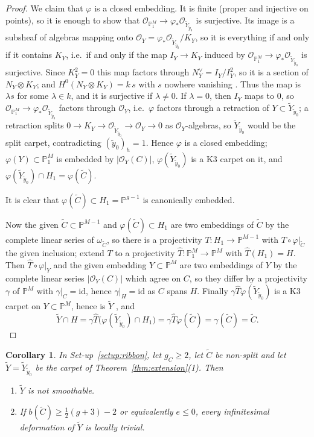 \documentclass[11pt,reqno]{amsart}
\theoremstyle{plain}
\newtheorem{corollary}[theorem]{Corollary}
\theoremstyle{definition}
\newcommand{\PP}{\mathbb{P}}
\newcommand{\PM}{\mathbb{P}^M}
\newcommand{\OO}{\mathcal{O}}
\newcommand{\id}{\mathrm{id}}
\newcommand{\Yt}{\widetilde{Y}}
\newcommand{\Ct}{\widetilde{C}}
\newcommand{\yt}{\tilde{y}}
\begin{document}
\begin{proof}
We claim that $\varphi$ is a closed embedding. It is finite (proper and injective on points), so it is enough to show that $\OO_{\PP^M_1}\to\varphi_*\OO_{\Yt_{\yt_0}}$ is surjective. Its image is a subsheaf of algebras mapping onto $\OO_Y=\varphi_*\OO_{\Yt_{\yt_0}}/K_Y$, so it is everything if and only if it contains $K_Y$, i.e.\ if and only if the map $I_Y\to K_Y$ induced by $\OO_{\PP^M_1}\to\varphi_*\OO_{\Yt_{\yt_0}}$ is surjective. Since $K_Y^2=0$ this map factors through $N_Y^{\vee}=I_Y/I_Y^2$, so it is a section of $N_Y\otimes K_Y$; and $H^0(N_Y\otimes K_Y)=k\,s$ with $s$ nowhere vanishing \cite[Proposition~3.2]{DM25}. Thus the map is $\lambda s$ for some $\lambda\in k$, and it is surjective if $\lambda\ne0$. If $\lambda=0$, then $I_Y$ maps to $0$, so $\OO_{\PP^M_1}\to\varphi_*\OO_{\Yt_{\yt_0}}$ factors through $\OO_Y$, i.e.\ $\varphi$ factors through a retraction of $Y\subset\Yt_{\yt_0}$; a retraction splits $0\to K_Y\to\OO_{\Yt_{\yt_0}}\to\OO_Y\to0$ as $\OO_Y$-algebras, so $\Yt_{\yt_0}$ would be the split carpet, contradicting $(\yt_0)_h=1$. Hence $\varphi$ is a closed embedding; $\varphi(Y)\subset\PP^M_1$ is embedded by $|\OO_Y(C)|$, $\varphi(\Yt_{\yt_0})$ is a K3 carpet on it, and $\varphi(\Yt_{\yt_0})\cap H_1=\varphi(\Ct)$.

It is clear that $\varphi(\Ct)\subset H_1=\PP^{g-1}$ is canonically embedded.

Now the given $\Ct\subset\PP^{M-1}$ and $\varphi(\Ct)\subset H_1$ are two embeddings of $\Ct$ by the complete linear series of $\omega_{\Ct}$, so there is a projectivity $T\colon H_1\to\PP^{M-1}$ with $T\circ\varphi|_{\Ct}$ the given inclusion; extend $T$ to a projectivity $\hat T\colon\PP^M_1\to\PM$ with $\hat T(H_1)=H$. Then $\hat T\circ\varphi|_Y$ and the given embedding $Y\subset\PM$ are two embeddings of $Y$ by the complete linear series $|\OO_Y(C)|$ which agree on $C$, so they differ by a projectivity $\gamma$ of $\PM$ with $\gamma|_C=\id$, hence $\gamma|_H=\id$ as $C$ spans $H$. Finally $\gamma\hat T\varphi(\Yt_{\yt_0})$ is a K3 carpet on $Y\subset\PM$, hence is $\Yt$ \cite[Proposition~1.7]{GP97}, and
\[
\Yt\cap H=\gamma\hat T\big(\varphi(\Yt_{\yt_0})\cap H_1\big)=\gamma\hat T\varphi(\Ct)=\gamma(\Ct)=\Ct .
\]
\end{proof}

\begin{corollary}\label{cor:nonsmoothable}
In Set-up~\ref{setup:ribbon}, let $g_C\ge2$, let $\Ct$ be non-split and let $\Yt=\Yt_{\yt_0}$ be the carpet of Theorem~\ref{thm:extension}(1). Then
\begin{enumerate}
\item $\Yt$ is not smoothable.
\item If $b(\Ct)\ge\frac12(g+3)-2$ or equivalently $e\le0$, every infinitesimal deformation of $\Yt$ is locally trivial.
\end{enumerate}
\end{corollary}
\end{document}
